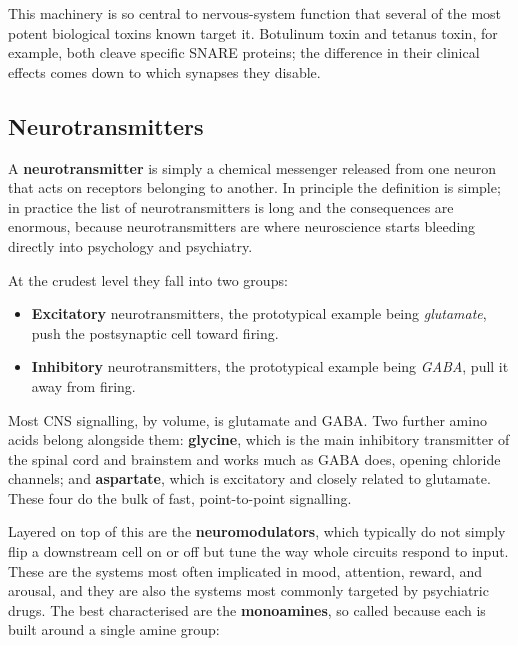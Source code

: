 \documentclass[11pt]{article}
\begin{document}
This machinery is so central to nervous-system function that several of the most potent biological toxins known target it. Botulinum toxin and tetanus toxin, for example, both cleave specific SNARE proteins; the difference in their clinical effects comes down to which synapses they disable.

\subsection{Neurotransmitters}

A \textbf{neurotransmitter} is simply a chemical messenger released from one neuron that acts on receptors belonging to another. In principle the definition is simple; in practice the list of neurotransmitters is long and the consequences are enormous, because neurotransmitters are where neuroscience starts bleeding directly into psychology and psychiatry.

At the crudest level they fall into two groups:

\begin{itemize}
    \item \textbf{Excitatory} neurotransmitters, the prototypical example being \textit{glutamate}, push the postsynaptic cell toward firing.
    \item \textbf{Inhibitory} neurotransmitters, the prototypical example being \textit{GABA}, pull it away from firing.
\end{itemize}

Most CNS signalling, by volume, is glutamate and GABA. Two further amino acids belong alongside them: \textbf{glycine}, which is the main inhibitory transmitter of the spinal cord and brainstem and works much as GABA does, opening chloride channels; and \textbf{aspartate}, which is excitatory and closely related to glutamate. These four do the bulk of fast, point-to-point signalling.

Layered on top of this are the \textbf{neuromodulators}, which typically do not simply flip a downstream cell on or off but tune the way whole circuits respond to input. These are the systems most often implicated in mood, attention, reward, and arousal, and they are also the systems most commonly targeted by psychiatric drugs. The best characterised are the \textbf{monoamines}, so called because each is built around a single amine group:
\end{document}
